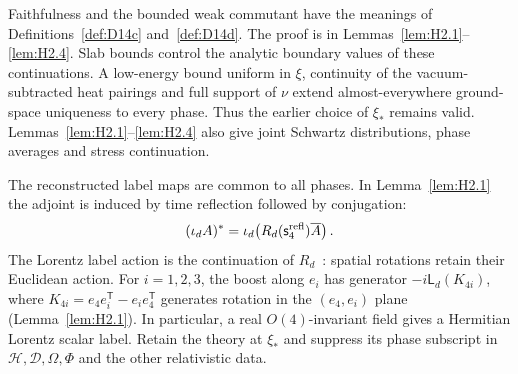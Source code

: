 Faithfulness and the bounded weak commutant have the meanings of Definitions~\ref{def:D14c} and~\ref{def:D14d}. The proof is in Lemmas~\ref{lem:H2.1}--\ref{lem:H2.4}. Slab bounds control the analytic boundary values of these continuations. A low-energy bound uniform in $\xi$, continuity of the vacuum-subtracted heat pairings and full support of $\nu$ extend almost-everywhere ground-space uniqueness to every phase. Thus the earlier choice of $\xi_*$ remains valid. Lemmas~\ref{lem:H2.1}--\ref{lem:H2.4} also give joint Schwartz distributions, phase averages and stress continuation.

The reconstructed label maps are common to all phases. In Lemma~\ref{lem:H2.1} the adjoint is induced by time reflection followed by conjugation:
\begin{equation*}
(\iota_dA)^*=\iota_d\bigl(R_d(\mathsf s_4^{\rm refl})\overline A\bigr)\,.
\end{equation*}
The Lorentz label action is the continuation of $R_d$~\cite{FrohlichOsterwalderSeiler1983}: spatial rotations retain their Euclidean action. For $i=1,2,3$, the boost along $e_i$ has generator $-i\mathsf L_d(K_{4i})$, where $K_{4i}=e_4e_i^{\mathsf T}-e_ie_4^{\mathsf T}$ generates rotation in the $(e_4,e_i)$ plane (Lemma~\ref{lem:H2.1}). In particular, a real $O(4)$-invariant field gives a Hermitian Lorentz scalar label. Retain the theory at $\xi_*$ and suppress its phase subscript in $\mathcal H,\mathcal D,\Omega,\Phi$ and the other relativistic data.
